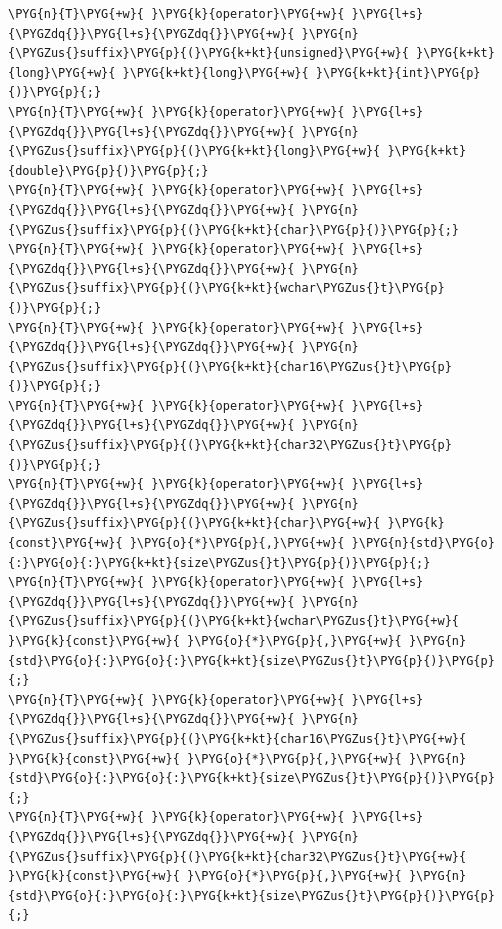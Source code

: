 \begin{codeblockbg}
\begin{Verbatim}[commandchars=\\\{\},breaklines=true,breakanywhere=true,fontsize=\codefont,xleftmargin=17bp]
\PYG{n}{T}\PYG{+w}{ }\PYG{k}{operator}\PYG{+w}{ }\PYG{l+s}{\PYGZdq{}}\PYG{l+s}{\PYGZdq{}}\PYG{+w}{ }\PYG{n}{\PYGZus{}suffix}\PYG{p}{(}\PYG{k+kt}{unsigned}\PYG{+w}{ }\PYG{k+kt}{long}\PYG{+w}{ }\PYG{k+kt}{long}\PYG{+w}{ }\PYG{k+kt}{int}\PYG{p}{)}\PYG{p}{;}
\PYG{n}{T}\PYG{+w}{ }\PYG{k}{operator}\PYG{+w}{ }\PYG{l+s}{\PYGZdq{}}\PYG{l+s}{\PYGZdq{}}\PYG{+w}{ }\PYG{n}{\PYGZus{}suffix}\PYG{p}{(}\PYG{k+kt}{long}\PYG{+w}{ }\PYG{k+kt}{double}\PYG{p}{)}\PYG{p}{;}
\PYG{n}{T}\PYG{+w}{ }\PYG{k}{operator}\PYG{+w}{ }\PYG{l+s}{\PYGZdq{}}\PYG{l+s}{\PYGZdq{}}\PYG{+w}{ }\PYG{n}{\PYGZus{}suffix}\PYG{p}{(}\PYG{k+kt}{char}\PYG{p}{)}\PYG{p}{;}
\PYG{n}{T}\PYG{+w}{ }\PYG{k}{operator}\PYG{+w}{ }\PYG{l+s}{\PYGZdq{}}\PYG{l+s}{\PYGZdq{}}\PYG{+w}{ }\PYG{n}{\PYGZus{}suffix}\PYG{p}{(}\PYG{k+kt}{wchar\PYGZus{}t}\PYG{p}{)}\PYG{p}{;}
\PYG{n}{T}\PYG{+w}{ }\PYG{k}{operator}\PYG{+w}{ }\PYG{l+s}{\PYGZdq{}}\PYG{l+s}{\PYGZdq{}}\PYG{+w}{ }\PYG{n}{\PYGZus{}suffix}\PYG{p}{(}\PYG{k+kt}{char16\PYGZus{}t}\PYG{p}{)}\PYG{p}{;}
\PYG{n}{T}\PYG{+w}{ }\PYG{k}{operator}\PYG{+w}{ }\PYG{l+s}{\PYGZdq{}}\PYG{l+s}{\PYGZdq{}}\PYG{+w}{ }\PYG{n}{\PYGZus{}suffix}\PYG{p}{(}\PYG{k+kt}{char32\PYGZus{}t}\PYG{p}{)}\PYG{p}{;}
\PYG{n}{T}\PYG{+w}{ }\PYG{k}{operator}\PYG{+w}{ }\PYG{l+s}{\PYGZdq{}}\PYG{l+s}{\PYGZdq{}}\PYG{+w}{ }\PYG{n}{\PYGZus{}suffix}\PYG{p}{(}\PYG{k+kt}{char}\PYG{+w}{ }\PYG{k}{const}\PYG{+w}{ }\PYG{o}{*}\PYG{p}{,}\PYG{+w}{ }\PYG{n}{std}\PYG{o}{:}\PYG{o}{:}\PYG{k+kt}{size\PYGZus{}t}\PYG{p}{)}\PYG{p}{;}
\PYG{n}{T}\PYG{+w}{ }\PYG{k}{operator}\PYG{+w}{ }\PYG{l+s}{\PYGZdq{}}\PYG{l+s}{\PYGZdq{}}\PYG{+w}{ }\PYG{n}{\PYGZus{}suffix}\PYG{p}{(}\PYG{k+kt}{wchar\PYGZus{}t}\PYG{+w}{ }\PYG{k}{const}\PYG{+w}{ }\PYG{o}{*}\PYG{p}{,}\PYG{+w}{ }\PYG{n}{std}\PYG{o}{:}\PYG{o}{:}\PYG{k+kt}{size\PYGZus{}t}\PYG{p}{)}\PYG{p}{;}
\PYG{n}{T}\PYG{+w}{ }\PYG{k}{operator}\PYG{+w}{ }\PYG{l+s}{\PYGZdq{}}\PYG{l+s}{\PYGZdq{}}\PYG{+w}{ }\PYG{n}{\PYGZus{}suffix}\PYG{p}{(}\PYG{k+kt}{char16\PYGZus{}t}\PYG{+w}{ }\PYG{k}{const}\PYG{+w}{ }\PYG{o}{*}\PYG{p}{,}\PYG{+w}{ }\PYG{n}{std}\PYG{o}{:}\PYG{o}{:}\PYG{k+kt}{size\PYGZus{}t}\PYG{p}{)}\PYG{p}{;}
\PYG{n}{T}\PYG{+w}{ }\PYG{k}{operator}\PYG{+w}{ }\PYG{l+s}{\PYGZdq{}}\PYG{l+s}{\PYGZdq{}}\PYG{+w}{ }\PYG{n}{\PYGZus{}suffix}\PYG{p}{(}\PYG{k+kt}{char32\PYGZus{}t}\PYG{+w}{ }\PYG{k}{const}\PYG{+w}{ }\PYG{o}{*}\PYG{p}{,}\PYG{+w}{ }\PYG{n}{std}\PYG{o}{:}\PYG{o}{:}\PYG{k+kt}{size\PYGZus{}t}\PYG{p}{)}\PYG{p}{;}
\end{Verbatim}
\end{codeblockbg}


